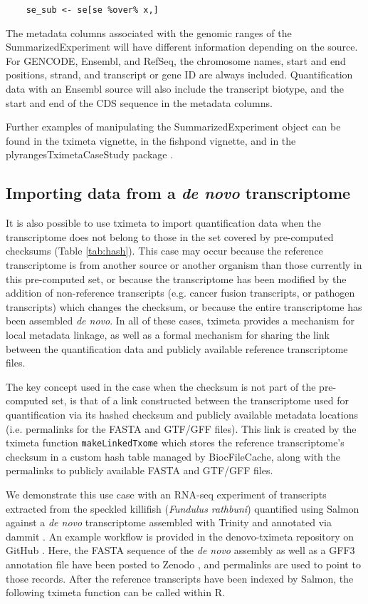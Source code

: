 \documentclass[10pt,letterpaper]{article}
\begin{document}
\begin{verbatim}
    se_sub <- se[se %over% x,]
\end{verbatim}

The metadata columns associated with the genomic ranges of the
SummarizedExperiment will have different information depending on the
source. For GENCODE, Ensembl, and RefSeq, the chromosome names, start
and end positions, strand, and transcript or gene ID are always
included. Quantification data with an Ensembl source will also include
the transcript biotype, and the start and end of the CDS sequence in
the metadata columns.

Further examples of manipulating the SummarizedExperiment object can
be found in the tximeta vignette, in the fishpond vignette, and in the
plyrangesTximetaCaseStudy package \cite{casestudy}.

\subsection*{Importing data from a \textit{de novo} transcriptome}

It is also possible to use tximeta to import quantification data when
the transcriptome does not belong to those in the set covered by pre-computed
checksums (Table \ref{tab:hash}). This case may occur because the
reference transcriptome is from another source or another organism
than those currently in this pre-computed set, or because the
transcriptome has been modified by the addition of non-reference
transcripts (e.g. cancer fusion transcripts, or pathogen transcripts)
which changes the checksum, or because the entire transcriptome has
been assembled \textit{de novo}. In all of these cases, tximeta
provides a mechanism for local metadata linkage, as well as a formal
mechanism for sharing the link between the quantification data and
publicly available reference transcriptome files.

The key concept used in the case when the checksum is not part of the
pre-computed set, is that of a link constructed between the
transcriptome used for quantification via its hashed checksum and
publicly available metadata locations (i.e. permalinks for the FASTA
and GTF/GFF files). This link is created by the tximeta function
\texttt{makeLinkedTxome} which stores the reference transcriptome's
checksum in a custom hash table managed by BiocFileCache, along with
the permalinks to publicly available FASTA and GTF/GFF files.

We demonstrate this use case with an RNA-seq experiment
\cite{killi-quant} of transcripts extracted from the speckled
killifish (\textit{Fundulus rathbuni}) 
quantified using Salmon \cite{salmon} against a \textit{de novo} transcriptome assembled with
Trinity \cite{trinity} and annotated via dammit \cite{dammit}. An
example workflow is provided in the denovo-tximeta repository on
GitHub \cite{denovo}. Here, the FASTA sequence of the
\textit{de novo} assembly as well as a GFF3 annotation file have been
posted to Zenodo \cite{killi-fasta,killi-gff}, and
permalinks are used to point to those 
records. After the reference transcripts have been indexed by Salmon,
the following tximeta function can be called within R.
\end{document}
